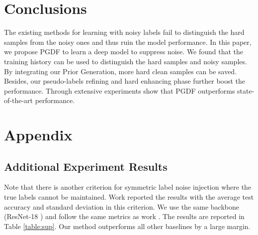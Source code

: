 \documentclass[letterpaper]{article} \usepackage{aaai22}  \usepackage{times}  \usepackage{helvet}  \usepackage{courier}  \usepackage[hyphens]{url}  \usepackage{graphicx} \urlstyle{rm} \def\UrlFont{\rm}  \usepackage{natbib}  \usepackage{caption} \DeclareCaptionStyle{ruled}{labelfont=normalfont,labelsep=colon,strut=off} \frenchspacing  \setlength{\pdfpagewidth}{8.5in}  \setlength{\pdfpageheight}{11in}  \usepackage{algorithm}
\begin{document}
\section{Conclusions}
The existing methods for learning with noisy labels fail to distinguish the hard samples from the noisy ones and thus ruin the model performance. In this paper, we propose PGDF to learn a deep model to suppress noise. We found that the training history can be used to distinguish the hard samples and noisy samples. By integrating our Prior Generation, more hard clean samples can be saved. Besides, our pseudo-labels refining and hard enhancing phase further boost the performance. Through extensive experiments show that PGDF outperforms state-of-the-art performance. 







\newpage
\appendix
\onecolumn
\section{Appendix}
\subsection{Additional Experiment Results}
Note that there is another criterion for symmetric label noise injection where the true labels cannot be maintained. Work \cite{2020A} reported the results with the average test accuracy and standard deviation  in this criterion. We use the same backbone (ResNet-18 \cite{2016Deep}) and follow the same metrics as work \cite{2020A}. The results are reported in Table \ref{table:sup}. Our method outperforms all other baselines by a large margin.
\end{document}
